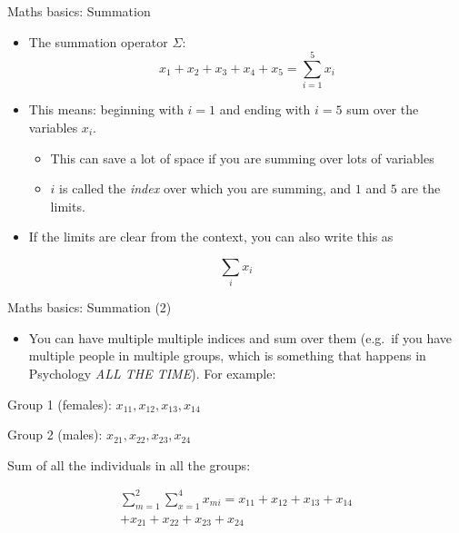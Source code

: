 \begin{frame}{Maths basics: Summation}

\begin{itemize}
\itemsep1pt\parskip0pt
\item
  The summation operator \(\Sigma\):
  \[x_1 + x_2 + x_3 + x_4 + x_5 = \sum\limits_{i=1}^5{x_i}\]
\item
  This means: beginning with \(i=1\) and ending with \(i=5\) sum over
  the variables \(x_i\).

  \begin{itemize}
  \itemsep1pt\parskip0pt
  \item
    This can save a lot of space if you are summing over lots of
    variables
  \item
    \(i\) is called the \emph{index} over which you are summing, and
    \(1\) and \(5\) are the limits.
  \end{itemize}
\item
  If the limits are clear from the context, you can also write this as
\end{itemize}

\[\sum\limits_{i}{x_i}\]

\end{frame}

\begin{frame}{Maths basics: Summation (2)}

\begin{itemize}
\itemsep1pt\parskip0pt
\item
  You can have multiple multiple indices and sum over them (e.g.~if you
  have multiple people in multiple groups, which is something that
  happens in Psychology \emph{ALL THE TIME}). For example:
\end{itemize}

Group 1 (females): \(x_{11}, x_{12}, x_{13}, x_{14}\)

Group 2 (males): \(x_{21}, x_{22}, x_{23}, x_{24}\)

Sum of all the individuals in all the groups:

\[
\begin{aligned}
\sum\limits_{m=1}^{2}\sum\limits_{x=1}^{4}{x_{mi}} = x_{11}+x_{12}+x_{13}+x_{14} \\
  + x_{21} + x_{22} + x_{23} + x_{24}
\end{aligned}
\]

\end{frame}

